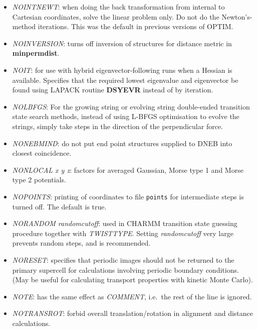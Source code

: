 \documentclass[12pt,a4paper,dvips]{article}
\begin{document}
\begin{itemize}
\item {\it NOINTNEWT\/}: when doing the back transformation from internal to
  Cartesian coordinates, solve the linear problem only. Do not do the
  Newton's-method iterations. This was the default in previous versions of
  OPTIM.

\item {\it NOINVERSION\/}: turns off inversion of structures for distance
metric in {\bf minpermdist}.

\item {\it NOIT\/}: for use with hybrid eigenvector-following runs when a Hessian is available.
                    Specifies that the required lowest eigenvalue and eigenvector be found using
                    LAPACK routine {\bf DSYEVR} instead of by iteration.

\item {\it NOLBFGS\/}: For the growing string or evolving string double-ended
  transition state search methods, instead of using L-BFGS optimisation to
  evolve the strings, simply take steps in the direction of the perpendicular force.

\item {\it NONEBMIND\/}: do not put end point structures supplied to DNEB into 
closest coincidence.

\item {\it NONLOCAL x y z\/}: factors for averaged Gaussian, Morse type 1 and Morse
type 2 potentials.

\item {\it NOPOINTS\/}: printing of coordinates to file {\tt points} for intermediate steps
is turned off. The default is true.

\item {\it NORANDOM randomcutoff\/}: used in CHARMM transition state guessing procedure
together with {\it TWISTTYPE\/}. Setting {\it randomcutoff\/} very large prevents random
steps, and is recommended.

\item {\it NORESET\/}: specifies that periodic images should not be returned to the
primary supercell for calculations involving periodic boundary conditions. (May be
useful for calculating transport properties with kinetic Monte Carlo).

\item {\it NOTE\/}: has the same effect as {\it COMMENT\/}, i.e.~the rest of the line
is ignored.

\item {\it NOTRANSROT\/}: forbid overall translation/rotation in alignment and distance
calculations.


\end{itemize}
\end{document}
